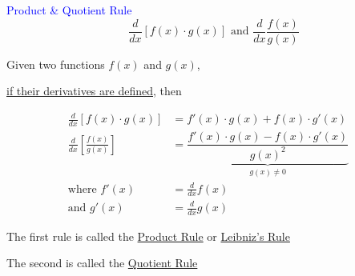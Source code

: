 \documentclass[14pt,fleqn]{extarticle}
\begin{document}
 

\begin{skill}
\begin{narrow}
\textcolor{blue}{Product \& Quotient Rule}
\[ \quad \frac{d}{dx}\left[ f(x)\cdot g(x) \right]\text{ and } \frac{d}{dx}\frac{f(x)}{g(x)}\]

\end{narrow}
\reason 

Given two functions $f(x)$ and $g(x)$, 

\underline{if their derivatives are defined}, then

%
\begin{align}
\frac{d}{dx}\left[ f(x)\cdot g(x) \right] &= f'(x)\cdot g(x) + f(x)\cdot g'(x) \\ 
\frac{d}{dx}\left[ \frac{f(x)}{g(x)}\right] &= \underbrace{\dfrac{f'(x)\cdot g(x) - f(x)\cdot g'(x) }{g(x)^2}}_{g(x)\neq 0}\\
\text{where } f'(x) &= \frac{d}{dx}f(x) \\
\text{and } g'(x) &= \frac{d}{dx} g(x) 
\end{align}

The first rule is called the \underline{Product Rule} or 
\underline{Leibniz's Rule}\newline 

The second is called the \underline{Quotient Rule}
%
\end{skill}
\end{document}
